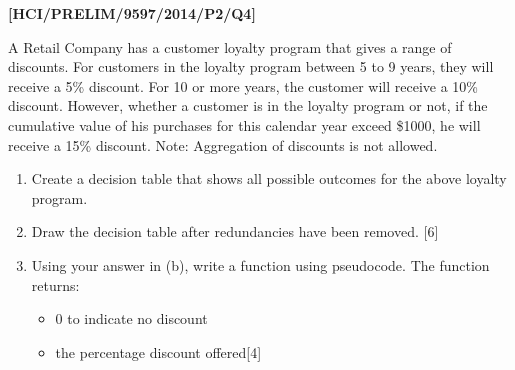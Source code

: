 \item \textbf{{[}HCI/PRELIM/9597/2014/P2/Q4{]} }

A Retail Company has a customer loyalty program that gives a range
of discounts. For customers in the loyalty program between 5 to 9
years, they will receive a 5\% discount. For 10 or more years, the
customer will receive a 10\% discount. However, whether a customer
is in the loyalty program or not, if the cumulative value of his purchases
for this calendar year exceed \$1000, he will receive a 15\% discount.
Note: Aggregation of discounts is not allowed. 
\begin{enumerate}
\item Create a decision table that shows all possible outcomes for the above
loyalty program. 
\item Draw the decision table after redundancies have been removed. \hfill{}{[}6{]}
\item Using your answer in (b), write a function using pseudocode. The function
returns: 
\begin{itemize}
\item 0 to indicate no discount 
\item the percentage discount offered\hfill{}{[}4{]}
\end{itemize}
\end{enumerate}